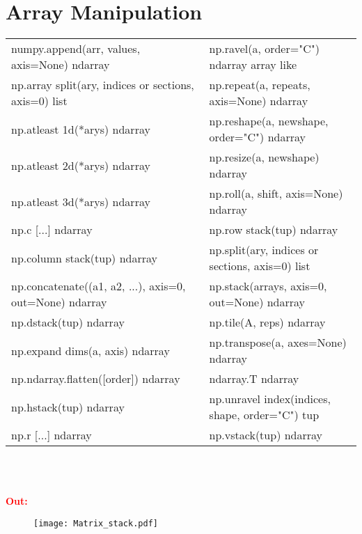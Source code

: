 \section*{Array Manipulation}
\hspace{1cm}
\begin{tabular}{|l l|}
	\hline
	  numpy.append(arr, values, axis=None) ndarray & np.ravel(a, order="C") ndarray array like
	\\np.array split(ary, indices or sections, axis=0) list &np.repeat(a, repeats, axis=None) ndarray
	\\np.atleast 1d(*arys) ndarray &np.reshape(a, newshape, order="C") ndarray
	\\np.atleast 2d(*arys) ndarray &np.resize(a, newshape) ndarray
	\\np.atleast 3d(*arys) ndarray &np.roll(a, shift, axis=None) ndarray
	\\np.c [...] ndarray &np.row stack(tup) ndarray
	\\np.column stack(tup) ndarray &np.split(ary, indices or sections, axis=0) list
	\\np.concatenate((a1, a2, ...), axis=0, out=None) ndarray &np.stack(arrays, axis=0, out=None) ndarray
	\\np.dstack(tup) ndarray &np.tile(A, reps) ndarray
	\\np.expand dims(a, axis) ndarray &np.transpose(a, axes=None) ndarray
	\\np.ndarray.flatten([order]) ndarray &ndarray.T ndarray
	\\np.hstack(tup) ndarray &np.unravel index(indices, shape, order="C") tup
	\\np.r [...] ndarray &np.vstack(tup) ndarray

	\\\hline
\end{tabular}
\\
\vspace{0.5cm}
\\\vspace{0.1cm}
\begin{minipage}[h]{10cm}
	
\end{minipage}
\begin{minipage}[h]{8cm}
	\textcolor{red}{\textbf{Out:}}

\end{minipage}

\begin{figure}[h]
	\texttt{[image: Matrix\_stack.pdf]}
\end{figure}

